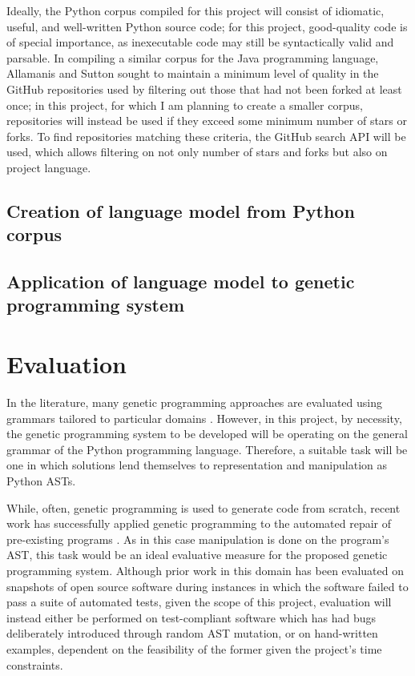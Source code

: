 \documentclass[a4paper,11pt]{proposal}
\begin{document}
Ideally, the Python corpus compiled for this project will consist of idiomatic, useful, and well-written Python source code; for this project, good-quality code is of special importance, as inexecutable code may still be syntactically valid and parsable. In compiling a similar corpus for the Java programming language, Allamanis and Sutton \cite{allamanis2013} sought to maintain a minimum level of quality in the GitHub repositories used by filtering out those that had not been forked at least once; in this project, for which I am planning to create a smaller corpus, repositories will instead be used if they exceed some minimum number of stars or forks. To find repositories matching these criteria, the GitHub search API will be used, which allows filtering on not only number of stars and forks but also on project language.

\subsection{Creation of language model from Python corpus}




\subsection{Application of language model to genetic programming system}

\section{Evaluation}

In the literature, many genetic programming approaches are evaluated using grammars tailored to particular domains \cite{mcdermott2012}. However, in this project, by necessity, the genetic programming system to be developed will be operating on the general grammar of the Python programming language. Therefore, a suitable task will be one in which solutions lend themselves to representation and manipulation as Python ASTs.

While, often, genetic programming is used to generate code from scratch, recent work has successfully applied genetic programming to the automated repair of pre-existing programs \cite{weimer2009}. As in this case manipulation is done on the program's AST, this task would be an ideal evaluative measure for the proposed genetic programming system. Although prior work in this domain has been evaluated on snapshots of open source software during instances in which the software failed to pass a suite of automated tests, given the scope of this project, evaluation will instead either be performed on test-compliant software which has had bugs deliberately introduced through random AST mutation, or on hand-written examples, dependent on the feasibility of the former given the project's time constraints.
\end{document}
